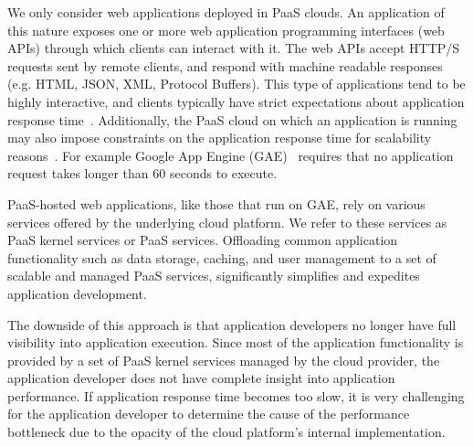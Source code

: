 

We only consider web
applications deployed in PaaS clouds. An application of this nature exposes
one or more web application programming interfaces (web APIs) through which
clients can interact with it. The web APIs accept HTTP/S requests sent by
remote clients, and respond with machine readable responses (e.g. HTML, JSON,
XML, Protocol Buffers). This type of applications tend to be highly
interactive, and clients typically have strict expectations about application
response time~\cite{latency-matters}. 
Additionally, the PaaS cloud on
which an application is running may also impose constraints on the
application response time for scalability
reasons~\cite{azure-limits,gae-limits}.  For example Google App Engine (GAE)~\cite{gae}
requires that no application request takes longer than 60 seconds to execute.

PaaS-hosted web applications, like those that run on GAE,  
rely on various services offered by the underlying
cloud platform. We refer to these services as PaaS kernel services or PaaS
services.
Offloading common application functionality such as data storage, caching,
and user management to a set of scalable and
managed PaaS services, significantly simplifies and expedites
application development.

The downside of this approach is that application developers no longer have full visibility
into application execution. Since most of the application functionality is provided by a set 
of PaaS kernel services managed by the cloud provider, the application
developer does not have complete insight into application performance. 
If application 
response time becomes too slow, it is very challenging
for the application developer to determine
the cause of the performance bottleneck due to the opacity of the cloud
platform's internal implementation. 

